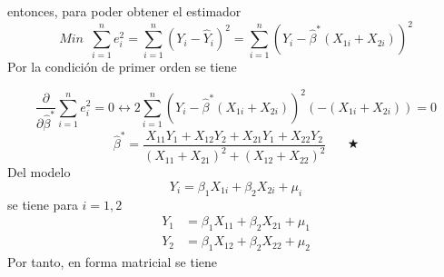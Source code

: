 \documentclass[10pt,a4paper, openany ]{book}
\begin{document}
  \noindent entonces, para poder obtener el estimador 
    \[
      Min \, \, \,  \sum\limits_{i=1}^{n} e_{i}^{2} = \sum\limits_{i=1}^{n} \left(Y_{i}-\hat{Y}_{i}\right)^{2}  = \sum\limits_{i=1}^{n} \left(Y_{i}- \hat{\beta}^{*} \left(X_{1i}+X_{2i}\right)    \right)^{2}
    \]
  Por la condición de primer orden se tiene

  \[
  \dfrac{\partial }{\partial \hat{\beta}^{*}}\sum\limits_{i=1}^{n} e_{i}^{2} = 0 \leftrightarrow 2 \sum\limits_{i=1}^{n} \left(Y_{i}- \hat{\beta}^{*} \left(X_{1i}+X_{2i}\right)    \right)^{2}\left(-\left(X_{1i}+X_{2i}\right) \right) = 0 
  \]
  \[
  \hat{\beta}^{*} = \dfrac{X_{11}Y_{1}+X_{12}Y_{2}+X_{21}Y_{1}+X_{22}Y_{2}}{\left(X_{11}+X_{21}\right)^{2} + \left(X_{12}+X_{22}\right)^{2}}\, \, \, \, \,\, \, \, \, \, \bigstar
  \]
  Del modelo 
  \[
  Y_{i} = \beta_{1}X_{1i}+\beta_{2}X_{2i}+\mu_{i}
  \]
  se tiene para $i = 1,2 $
  \begin{align*}
    Y_{1} &= \beta_{1}X_{11}+\beta_{2}X_{21}+\mu_{1}\\
    Y_{2} &= \beta_{1}X_{12}+\beta_{2}X_{22}+\mu_{2}
  \end{align*}
  Por tanto, en forma matricial se tiene 
\end{document}
